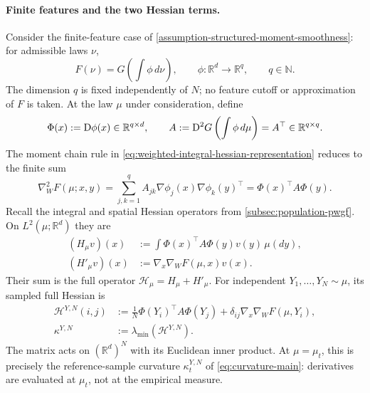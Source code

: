 \paragraph{Finite features and the two Hessian terms.}
Consider the finite-feature case of
\cref{assumption-structured-moment-smoothness}: for admissible laws $\nu$,
\begin{equation}
 F(\nu)=G\left(\int\phi\,d\nu\right),\qquad
 \phi:\mathbb R^d\longrightarrow\mathbb R^q,\qquad q\in\mathbb N.
 \label{eq:finite-feature-objective}
\end{equation}
The dimension $q$ is fixed independently of $N$; no feature cutoff or
approximation of $F$ is taken. At the law $\mu$ under consideration,
define
\begin{equation}
 \Phi(x):=\mathrm{D}\phi(x)\in\mathbb R^{q\times d},\qquad
 A:=\mathrm{D}^2G\left(\int\phi\,d\mu\right)=A^\top\in\mathbb R^{q\times q}.
 \label{eq:finite-feature-derivatives}
\end{equation}
The moment chain rule in \cref{eq:weighted-integral-hessian-representation}
reduces to the finite sum
\[
 \nabla_W^2F(\mu;x,y)
 =\sum_{j,k=1}^q A_{jk}\nabla\phi_j(x)\nabla\phi_k(y)^\top
 =\Phi(x)^\top A\Phi(y).
\]
Recall the integral and spatial Hessian operators from
\cref{subsec:population-pwgf}. On $L^2(\mu;\mathbb R^d)$ they are
\begin{equation}
 \begin{split}
 (H_\mu v)(x)&:=
   \int\Phi(x)^\top A\Phi(y)v(y)\,\mu(dy),\\
 (H'_\mu v)(x)&:=
   \nabla_x\nabla_WF(\mu,x)v(x).
 \end{split}
 \label{eq:finite-feature-hessian-operators}
\end{equation}
Their sum is the full operator $\mathcal H_\mu=H_\mu+H'_\mu$.
For independent $Y_1,\ldots,Y_N\sim\mu$, its sampled full Hessian is
\begin{equation}
 \begin{split}
 \mathcal H^{Y,N}(i,j)
 &:=\frac1N\Phi(Y_i)^\top A\Phi(Y_j)
      +\delta_{ij}\nabla_x\nabla_WF(\mu,Y_i),\\
 \kappa^{Y,N}&:=\lambda_{\min}(\mathcal H^{Y,N}).
 \end{split}
 \label{eq:finite-feature-sampled-hessian}
\end{equation}
The matrix acts on $(\mathbb R^d)^N$ with its Euclidean inner product.
At $\mu=\mu_t$, this is precisely the reference-sample curvature
$\kappa_t^{Y,N}$ of \eqref{eq:curvature-main}: derivatives are evaluated
at $\mu_t$, not at the empirical measure.

